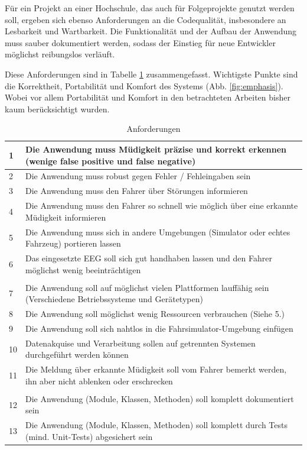 Für ein Projekt an einer Hochschule, das auch für Folgeprojekte genutzt werden soll, ergeben sich ebenso Anforderungen an die Codequalität, insbesondere an Lesbarkeit und Wartbarkeit. Die Funktionalität und der Aufbau der Anwendung muss sauber dokumentiert werden, sodass der Einstieg für neue Entwickler möglichst reibungslos verläuft.

Diese Anforderungen sind in Tabelle \ref{tab:requirements} zusammengefasst. Wichtigste Punkte sind die Korrektheit, Portabilität und Komfort des Systems (Abb. \ref{fig:emphasis}). Wobei vor allem Portabilität und Komfort in den betrachteten Arbeiten bisher kaum berücksichtigt wurden.

\begin{table}[t]
 \caption{Anforderungen}
 \renewcommand{\arraystretch}{2}
 \begin{tabularx}{\textwidth}{lX}
  1 & Die Anwendung muss Müdigkeit präzise und korrekt erkennen (wenige false positive und false negative) \\ \hline
  2 & Die Anwendung muss robust gegen Fehler / Fehleingaben sein \\ \hline 
  3 & Die Anwendung muss den Fahrer über Störungen informieren \\ \hline
  4 & Die Anwendung muss den Fahrer so schnell wie möglich über eine erkannte Müdigkeit informieren \\ \hline
  5 & Die Anwendung muss sich in andere Umgebungen (Simulator oder echtes Fahrzeug) portieren lassen \\ \hline 
  6 & Das eingesetzte EEG soll sich gut handhaben lassen und den Fahrer möglichst wenig beeinträchtigen \\ \hline
  \\
  7 & Die Anwendung soll auf möglichst vielen Plattformen lauffähig sein (Verschiedene Betriebssysteme und Gerätetypen) \\ \hline
  8 & Die Anwendung soll möglichst wenig Ressourcen verbrauchen (Siehe 5.) \\ \hline
  9 & Die Anwendung soll sich nahtlos in die Fahrsimulator-Umgebung einfügen \\ \hline
  10 & Datenakquise und Verarbeitung sollen auf getrennten Systemen durchgeführt werden können \\ \hline
  11 & Die Meldung über erkannte Müdigkeit soll vom Fahrer bemerkt werden, ihn aber nicht ablenken oder erschrecken \\ \hline
  \\
  12 & Die Anwendung (Module, Klassen, Methoden) soll komplett dokumentiert sein \\ \hline 
  13 & Die Anwendung (Module, Klassen, Methoden) soll komplett durch Tests (mind. Unit-Tests) abgesichert sein \\ \hline
 \end{tabularx}
 \label{tab:requirements}
\end{table}

